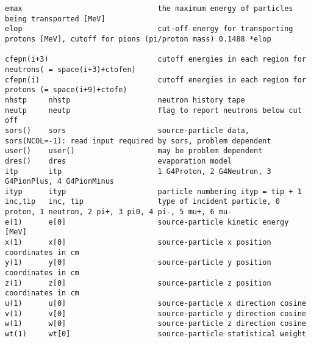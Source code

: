 \begin{verbatim}
emax                               the maximum energy of particles being transported [MeV]
elop                               cut-off energy for transporting protons [MeV], cutoff for pions (pi/proton mass) 0.1488 *elop

cfepn(i+3)                         cutoff energies in each region for neutrons( = space(i+3)+ctofen)
cfepn(i)                           cutoff energies in each region for protons (= space(i+9)+ctofe)
nhstp     nhstp                    neutron history tape
neutp     neutp                    flag to report neutrons below cut off
sors()    sors                     source-particle data, sors(NCOL=-1): read input required by sors, problem dependent
user()    user()                   may be problem dependent
dres()    dres                     evaporation model
itp       itp                      1 G4Proton, 2 G4Neutron, 3 G4PionPlus, 4 G4PionMinus
ityp      ityp                     particle numbering ityp = tip + 1
inc,tip   inc, tip                 type of incident particle, 0 proton, 1 neutron, 2 pi+, 3 pi0, 4 pi-, 5 mu+, 6 mu-
e(1)      e[0]                     source-particle kinetic energy [MeV]
x(1)      x[0]                     source-particle x position coordinates in cm
y(1)      y[0]                     source-particle y position coordinates in cm
z(1)      z[0]                     source-particle z position coordinates in cm
u(1)      u[0]                     source-particle x direction cosine
v(1)      v[0]                     source-particle y direction cosine
w(1)      w[0]                     source-particle z direction cosine
wt(1)     wt[0]                    source-particle statistical weight


\end{verbatim}
